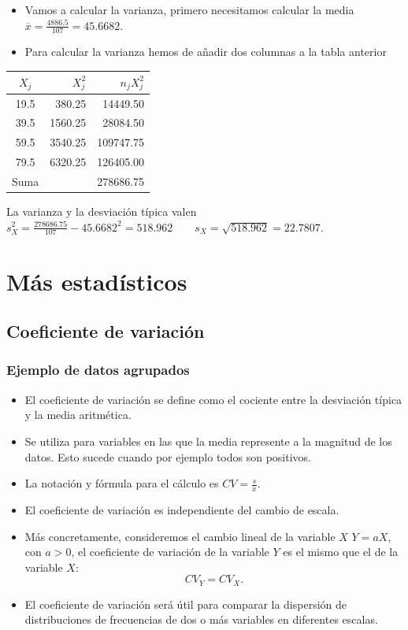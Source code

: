 \begin{frame}
\begin{itemize}
\item Vamos a calcular la varianza, primero necesitamos calcular la media $\overline{x}=\frac{4886.5}{107}=45.6682$.
\item Para calcular la varianza hemos de añadir dos columnas a la tabla anterior
\end{itemize}
\begin{center}
\begin{tabular}{crr}
 $X_j$ & $X_j^2$ & $n_jX_j^2$ \\
\hline
 19.5  & 380.25  & 14449.50 \\
 39.5  & 1560.25 &  28084.50 \\
 59.5  & 3540.25 & 109747.75 \\
 79.5  & 6320.25 & 126405.00 \\
\hline Suma   &          & 278686.75
\end{tabular}
\end{center}
 La varianza y la desviación  típica valen $s_X^2=\frac{278686.75}{107}-45.6682^2=518.962 \qquad s_X=\sqrt{518.962}=22.7807$.
\end{frame}

\section{Más estadísticos}
\subsection{Coeficiente de variación}

\begin{frame}
\frametitle{Ejemplo de datos agrupados}
\begin{itemize}
\item  El coeficiente de variación  se define como el cociente entre la desviación típica  y la media aritmética.
\item  Se utiliza para variables en las que la media represente a la magnitud de los
datos. Esto sucede cuando por ejemplo todos son positivos.
\item La notación y fórmula para el cálculo es $CV=\frac{s}{\overline{x}}.$
\end{itemize}
\end{frame}

\begin{frame}
\begin{itemize}
\item  El coeficiente de variación  es independiente del cambio de escala. 
\item Más concretamente, consideremos  el cambio lineal  de la variable $X$ $Y=a X$, con $a>0$,  el coeficiente de
variación  de la variable $Y$ es el mismo que el de la variable $X$:
$$CV_Y=CV_X.$$
\item El coeficiente de variación será útil para comparar la dispersión de distribuciones
 de frecuencias de dos o más variables en diferentes escalas.
\end{itemize}
\end{frame}

